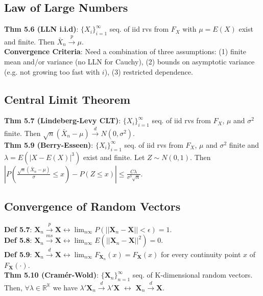 \subsection{Law of Large Numbers}
\textbf{Thm 5.6 (LLN i.i.d)}: $\{X_i\}_{i=1}^\infty$ seq. of iid rvs from $F_X$ with $\mu=E(X)$ exist and finite. Then $\bar{X}_n\xrightarrow{p}\mu$.\\
\textbf{Convergence Criteria}: Need a combination of three assumptions: (1) finite mean and/or variance (no LLN for Cauchy), (2) bounds on asymptotic variance (e.g. not growing too fast with $i$), (3) restricted dependence.

\subsection{Central Limit Theorem}
\textbf{Thm 5.7 (Lindeberg-Levy CLT)}: $\{X_i\}_{i=1}^\infty$ seq. of iid rvs from $F_X$, $\mu$ and $\sigma^2$ finite. Then $\sqrt{n}(\bar{X}_n-\mu) \xrightarrow{d} N(0,\sigma^2)$. \\
\textbf{Thm 5.9 (Berry-Esseen)}: $\{X_i\}_{i=1}^\infty$ seq. of iid rvs from $F_X$, $\mu$ and $\sigma^2$ finite and $\lambda = E(|X-E(X)|^3)$ exist and finite. Let $Z\sim N(0,1)$. Then $|P\left(\frac{\sqrt{n}(\bar{X}_n-\mu)}{\sigma}\leq x\right) - P(Z\leq x)| \leq \frac{C\lambda}{\sigma^3\sqrt{n}}$.\\

\subsection{Convergence of Random Vectors}
\textbf{Def 5.7}: $\textbf{X}_n \xrightarrow{p} \textbf{X} \leftrightarrow \lim_{n\infty}P(||\textbf{X}_n - \textbf{X}||<\epsilon)=1$.\\
\textbf{Def 5.8}: $\textbf{X}_n \xrightarrow{ms} \textbf{X} \leftrightarrow \lim_{n\infty}E(||\textbf{X}_n - \textbf{X}||^2)=0$.\\
\textbf{Def 5.9}: $\textbf{X}_n \xrightarrow{d} \textbf{X} \leftrightarrow \lim_{n\infty}F_{\textbf{X}_n}(x) = F_\textbf{X}(x)$ for every continuity point $x$ of $F_\textbf{X}(\cdot)$.\\
\textbf{Thm 5.10 (Cramér-Wold)}: $\{\textbf{X}_n\}_{n=1}^\infty$ seq. of K-dimensional random vectors. Then, $\forall \lambda\in\mathbb{R^K}$ we have $\lambda'\textbf{X}_n \xrightarrow{d} \lambda'\textbf{X}$ $\leftrightarrow$ $\textbf{X}_n \xrightarrow{d} \textbf{X}$.

